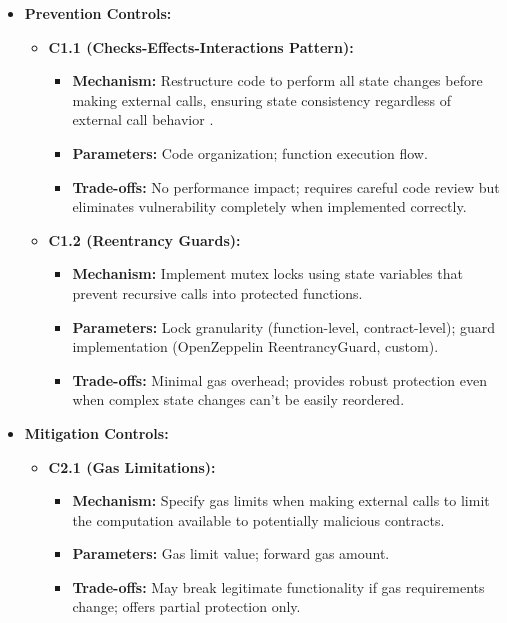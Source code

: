 \begin{itemize}
\item \textbf{Prevention Controls:}
    \begin{itemize}
    \item \textbf{C1.1 (Checks-Effects-Interactions Pattern):}
        \begin{itemize}
        \item \textbf{Mechanism:} Restructure code to perform all state changes before making external calls, ensuring state consistency regardless of external call behavior \cite{praitheeshan2019systematic}.
        \item \textbf{Parameters:} Code organization; function execution flow.
        \item \textbf{Trade-offs:} No performance impact; requires careful code review but eliminates vulnerability completely when implemented correctly.
        \end{itemize}
    
    \item \textbf{C1.2 (Reentrancy Guards):}
        \begin{itemize}
        \item \textbf{Mechanism:} Implement mutex locks using state variables that prevent recursive calls into protected functions.
        \item \textbf{Parameters:} Lock granularity (function-level, contract-level); guard implementation (OpenZeppelin ReentrancyGuard, custom).
        \item \textbf{Trade-offs:} Minimal gas overhead; provides robust protection even when complex state changes can't be easily reordered.
        \end{itemize}
    \end{itemize}

\item \textbf{Mitigation Controls:}
    \begin{itemize}
    \item \textbf{C2.1 (Gas Limitations):}
        \begin{itemize}
        \item \textbf{Mechanism:} Specify gas limits when making external calls to limit the computation available to potentially malicious contracts.
        \item \textbf{Parameters:} Gas limit value; forward gas amount.
        \item \textbf{Trade-offs:} May break legitimate functionality if gas requirements change; offers partial protection only.
        \end{itemize}
    

\end{itemize}
\end{itemize}
